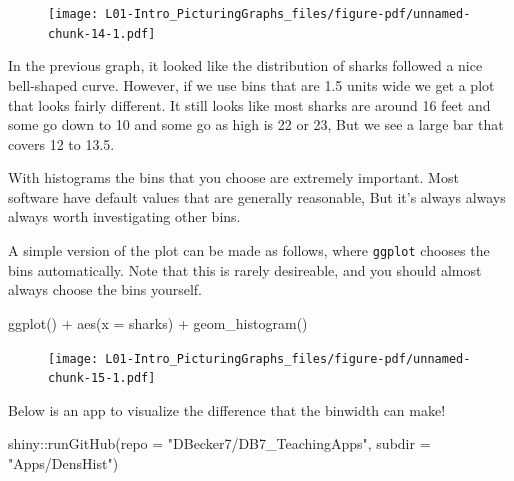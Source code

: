 \documentclass[
  letterpaper,
  DIV=11,
  numbers=noendperiod,
  oneside]{scrreprt}
\newenvironment{Shaded}{\begin{snugshade}}{\end{snugshade}}
\newcommand{\AttributeTok}[1]{\textcolor[rgb]{0.40,0.45,0.13}{#1}}
\newcommand{\FunctionTok}[1]{\textcolor[rgb]{0.28,0.35,0.67}{#1}}
\newcommand{\NormalTok}[1]{\textcolor[rgb]{0.00,0.23,0.31}{#1}}
\newcommand{\SpecialCharTok}[1]{\textcolor[rgb]{0.37,0.37,0.37}{#1}}
\newcommand{\StringTok}[1]{\textcolor[rgb]{0.13,0.47,0.30}{#1}}
\begin{document}
\begin{figure}[H]

{\centering \texttt{[image: L01-Intro\_PicturingGraphs\_files/figure-pdf/unnamed-chunk-14-1.pdf]}

}

\end{figure}

In the previous graph, it looked like the distribution of sharks
followed a nice bell-shaped curve. However, if we use bins that are 1.5
units wide we get a plot that looks fairly different. It still looks
like most sharks are around 16 feet and some go down to 10 and some go
as high is 22 or 23, But we see a large bar that covers 12 to 13.5.

With histograms the bins that you choose are extremely important. Most
software have default values that are generally reasonable, But it's
always always always worth investigating other bins.

A simple version of the plot can be made as follows, where
\texttt{ggplot} chooses the bins automatically. Note that this is rarely
desireable, and you should almost always choose the bins yourself.

\begin{Shaded}
\begin{Highlighting}[]
\FunctionTok{ggplot}\NormalTok{() }\SpecialCharTok{+} 
    \FunctionTok{aes}\NormalTok{(}\AttributeTok{x =}\NormalTok{ sharks) }\SpecialCharTok{+}
    \FunctionTok{geom\_histogram}\NormalTok{()}
\end{Highlighting}
\end{Shaded}

\begin{figure}[H]

{\centering \texttt{[image: L01-Intro\_PicturingGraphs\_files/figure-pdf/unnamed-chunk-15-1.pdf]}

}

\end{figure}

Below is an app to visualize the difference that the binwidth can make!

\begin{Shaded}
\begin{Highlighting}[]
\NormalTok{shiny}\SpecialCharTok{::}\FunctionTok{runGitHub}\NormalTok{(}\AttributeTok{repo =} \StringTok{"DBecker7/DB7\_TeachingApps"}\NormalTok{, }
    \AttributeTok{subdir =} \StringTok{"Apps/DensHist"}\NormalTok{)}
\end{Highlighting}
\end{Shaded}
\end{document}
